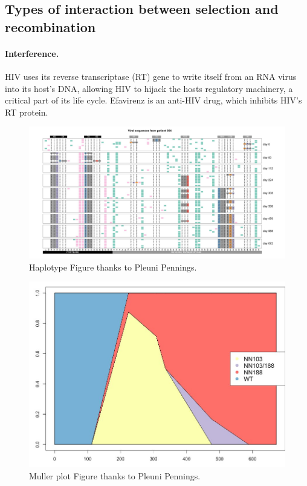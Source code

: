 \subsection{Types of interaction between selection and recombination}

\paragraph{Interference.}

HIV uses its reverse transcriptase (RT) gene to write itself from an RNA virus into its host's DNA, allowing HIV to hijack the hosts regulatory machinery, a critical part of its life cycle. 
Efavirenz is an anti-HIV drug, which inhibits HIV's RT protein. 

\begin{figure}
\begin{center}
  \includegraphics[width =  \textwidth]{Journal_figs/recom_selection/Pleuni_HIV_interference/DdwdkVeVMAA7t-V.jpg}
\end{center}
\caption{Haplotype Figure thanks to Pleuni Pennings.} \label{fig:HIV_interference}  %
\end{figure}

\begin{figure}
\begin{center}
  \includegraphics[width = 0.8 \textwidth]{Journal_figs/recom_selection/Pleuni_HIV_interference/DdweQyxU0AA7mXe.jpg}
\end{center}
\caption{Muller plot Figure thanks to Pleuni Pennings.} \label{fig:HIV_interference_M}  %
\end{figure}


